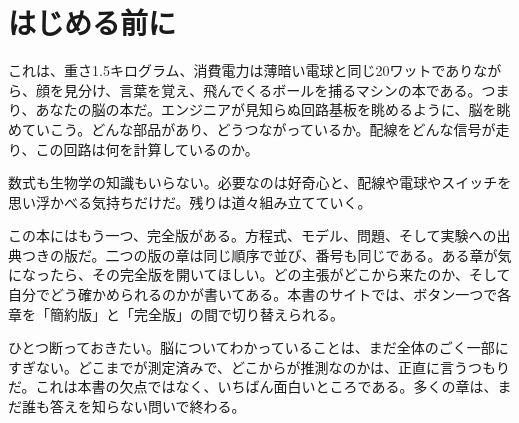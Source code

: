 \chapter*{はじめる前に}

これは、重さ1.5キログラム、消費電力は薄暗い電球と同じ20ワットでありながら、顔を見分け、言葉を覚え、飛んでくるボールを捕るマシンの本である。つまり、あなたの脳の本だ。エンジニアが見知らぬ回路基板を眺めるように、脳を眺めていこう。どんな部品があり、どうつながっているか。配線をどんな信号が走り、この回路は何を計算しているのか。

数式も生物学の知識もいらない。必要なのは好奇心と、配線や電球やスイッチを思い浮かべる気持ちだけだ。残りは道々組み立てていく。

この本にはもう一つ、完全版がある。方程式、モデル、問題、そして実験への出典つきの版だ。二つの版の章は同じ順序で並び、番号も同じである。ある章が気になったら、その完全版を開いてほしい。どの主張がどこから来たのか、そして自分でどう確かめられるのかが書いてある。本書のサイトでは、ボタン一つで各章を「簡約版」と「完全版」の間で切り替えられる。

ひとつ断っておきたい。脳についてわかっていることは、まだ全体のごく一部にすぎない。どこまでが測定済みで、どこからが推測なのかは、正直に言うつもりだ。これは本書の欠点ではなく、いちばん面白いところである。多くの章は、まだ誰も答えを知らない問いで終わる。
